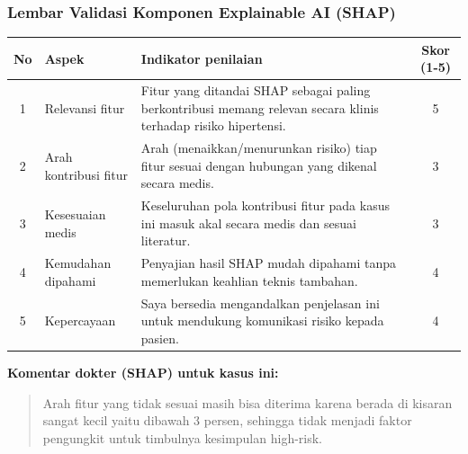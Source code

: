 \subsubsection*{Lembar Validasi Komponen Explainable AI (SHAP)}
\begin{center}
\begin{tabular}{|c|p{3.5cm}|p{7.5cm}|c|}
\hline
\textbf{No} & \textbf{Aspek} & \textbf{Indikator penilaian} & \textbf{Skor (1-5)} \\ \hline
1 & Relevansi fitur & Fitur yang ditandai SHAP sebagai paling berkontribusi memang relevan secara klinis terhadap risiko hipertensi. & 5 \\ \hline
2 & Arah kontribusi fitur & Arah (menaikkan/menurunkan risiko) tiap fitur sesuai dengan hubungan yang dikenal secara medis. & 3 \\ \hline
3 & Kesesuaian medis & Keseluruhan pola kontribusi fitur pada kasus ini masuk akal secara medis dan sesuai literatur. & 3 \\ \hline
4 & Kemudahan dipahami & Penyajian hasil SHAP mudah dipahami tanpa memerlukan keahlian teknis tambahan. & 4 \\ \hline
5 & Kepercayaan & Saya bersedia mengandalkan penjelasan ini untuk mendukung komunikasi risiko kepada pasien. & 4 \\ \hline
\end{tabular}
\end{center}

\textbf{Komentar dokter (SHAP) untuk kasus ini:}
\begin{quote}
Arah fitur yang tidak sesuai masih bisa diterima karena berada di kisaran sangat kecil yaitu dibawah 3 persen, sehingga tidak menjadi faktor pengungkit untuk timbulnya kesimpulan high-risk.
\end{quote}

